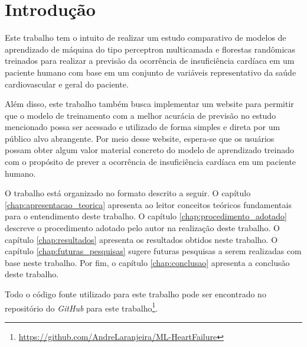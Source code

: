 \chapter{Introdução} \label{chap:introducao}

Este trabalho tem o intuito de realizar um estudo comparativo de modelos de aprendizado de máquina do tipo perceptron multicamada e florestas randômicas treinados para realizar a previsão da ocorrência de insuficiência cardíaca em um paciente humano com base em um conjunto de variáveis representativo da saúde cardiovascular e geral do paciente.

Além disso, este trabalho também busca implementar um website para permitir que o modelo de treinamento com a melhor acurácia de previsão no estudo mencionado possa ser acessado e utilizado de forma simples e direta por um público alvo abrangente. Por meio desse website, espera-se que os usuários possam obter algum valor material concreto do modelo de aprendizado treinado com o propósito de prever a ocorrência de insuficiência cardíaca em um paciente humano.

O trabalho está organizado no formato descrito a seguir. O capítulo \ref{chap:apresentacao_teorica} apresenta ao leitor conceitos teóricos fundamentais para o entendimento deste trabalho. O capítulo \ref{chap:procedimento_adotado} descreve o procedimento adotado pelo autor na realização deste trabalho. O capítulo \ref{chap:resultados} apresenta os resultados obtidos neste trabalho. O capítulo \ref{chap:futuras_pesquisas} sugere futuras pesquisas a serem realizadas com base neste trabalho. Por fim, o capítulo \ref{chap:conclusao} apresenta a conclusão deste trabalho.

Todo o código fonte utilizado para este trabalho pode ser encontrado no repositório do \textit{GitHub} para este trabalho\footnote{\url{https://github.com/AndreLaranjeira/ML-HeartFailure}}. 

